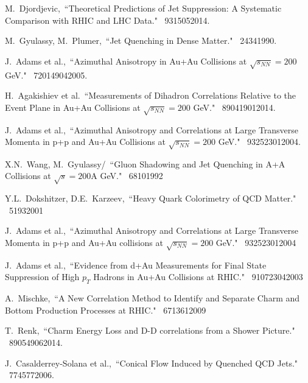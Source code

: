 \begin{thebibliography}{1000}
M.~Djordjevic,~``Theoretical Predictions of Jet Suppression: A Systematic Comparison with RHIC and LHC Data." \Journal{\NPA} {~931}{505}{2014}.

M.~Gyulassy, M.~Plumer,~``Jet Quenching in Dense Matter." \Journal{\PLB} {~243}{4}{1990}.

J.~Adams et al.,~``Azimuthal Anisotropy in Au+Au Collisions at $\sqrt{s_{NN}} = 200$ GeV." \Journal{\PRC} {~72}{014904}{2005}.

H.~Agakishiev et al.~``Measurements of Dihadron Correlations Relative to the Event Plane in Au+Au Collisions at $\sqrt{s_{NN}} = 200$ GeV." \Journal{\PRC} {~89}{041901}{2014}.

J.~Adams et al.,~``Azimuthal Anisotropy and Correlations at Large Transverse Momenta in p+p and Au+Au Collisions at $\sqrt{s_{NN}} = 200$ GeV." \Journal{\PRL} {~93}{252301}{2004}.

X.N.~Wang, M.~Gyulassy/~``Gluon Shadowing and Jet Quenching in A+A Collisions at $\sqrt{s} = 200$A GeV." \Journal{\PRL} {~68}{10}{1992}

Y.L.~Dokshitzer, D.E.~Karzeev,~``Heavy Quark Colorimetry of QCD Matter." \Journal{\PLB} {~519}{3}{2001}

J.~Adams et al.,~``Azimuthal Anisotropy and Correlations at Large Transverse Momenta in p+p and Au+Au collisions at $\sqrt{s_{NN}} = 200$ GeV." \Journal{\PRL} {~93}{252301}{2004}

J.~Adams et al.,~``Evidence from d+Au Measurements for Final State Suppression of High $p_T$ Hadrons in Au+Au Collisions at RHIC." \Journal{\PRL} {~91}{072304}{2003}

A.~Mischke,~``A New Correlation Method to Identify and Separate Charm and Bottom Production Processes at RHIC." \Journal{\PLB} {~671}{361}{2009}

T.~Renk,~``Charm Energy Loss and D-D correlations from a Shower Picture." \Journal{\PRC} {~89}{054906}{2014}.

J.~Casalderrey-Solana et al.,~``Conical Flow Induced by Quenched QCD Jets." \Journal{\NPA} {~774}{577}{2006}.

\end{thebibliography}
